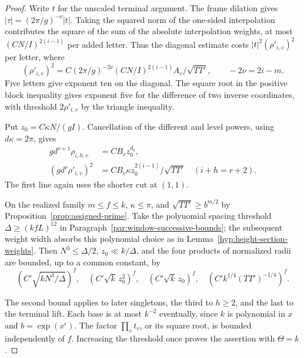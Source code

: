 \begin{proof}
Write \(t\) for the unscaled terminal argument. The frame dilation gives \(|\tau|=(2\pi/g)^{-\nu}|t|\). Taking the squared norm of the one-sided interpolation contributes the square of the sum of the absolute interpolation weights, at most \((CN/I)^{2(i-1)}\) per added letter. Thus the diagonal estimate costs \(|t|^2(\rho'_{i,v})^2\) per letter, where
\[
 (\rho'_{i,v})^2
  =C(2\pi/g)^{-2\nu}(C N/I)^{2(i-1)}A_v/\sqrt{TT'},
 \qquad -2\nu=2i-m .
\]
Five letters give exponent ten on the diagonal. The square root in the positive block inequality gives exponent five for the difference of two inverse coordinates, with threshold \(2\rho'_{i,v}\) by the triangle inequality.

Put \(z_0=C\kappa N/(gI)\). Cancellation of the different and level
powers, using \(d\kappa=2\pi\), gives
\[
 \begin{aligned}
 gd^{\nu+1}\rho_{i,h,v}&=CB_v z_0^{d_0},\\
 (gd^{\nu}\rho'_{i,v})^2&=CB_v\kappa z_0^{2(i-1)}/\sqrt{TT'}
                     \quad(i+h=r+2).
 \end{aligned}
\]
The first line again uses the shorter cut at \((1,1)\).


On the realized family \(m\le f\le k\), \(\kappa\le\pi\),
and \(\sqrt{TT'}\ge b^{m/2}\) by Proposition~\ref{prop:assigned-prime}.
Take the polynomial spacing threshold \(\Delta\ge(kfL)^{12}\)
in Paragraph~\ref{par:window-successive-bounds}; the subsequent
weight width absorbs this polynomial choice as in
Lemma~\ref{hyp:height-section-weights}. Then \(N^3\le\Delta/2\),
\(z_0\ll k/\Delta\), and the four products of normalized radii
are bounded, up to a common constant, by
\[
 \left(C'\sqrt{kN^3/\Delta}\right)^f,\quad
 \left(C'\sqrt k\,z_0^2\right)^f,\quad
 \left(C'\sqrt k\,z_0\right)^f,\quad
 \left(C' k^{1/4}(TT')^{-1/4}\right)^f .
\]


The second bound applies to later singletons, the third to
\(h\ge2\), and the last to the terminal lift. Each base is at
most \(k^{-2}\) eventually, since \(k\) is polynomial in \(x\)
and \(b=\exp(x^\epsilon)\). The factor \(\prod_v t_v\), or its
square root, is bounded independently of \(f\). Increasing the
threshold once proves the assertion with \(\Theta=k\).
\end{proof}
